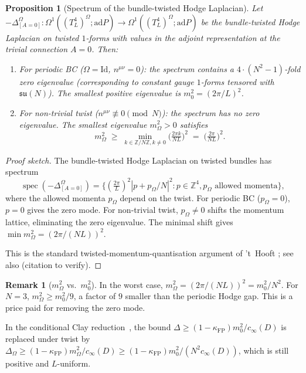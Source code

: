 \documentclass[11pt,a4paper]{amsart}
\newtheorem{proposition}[theorem]{Proposition}
\theoremstyle{definition}
\newtheorem{remark}[theorem]{Remark}
\newcommand{\Z}{\mathbb{Z}}
\newcommand{\su}{\mathfrak{su}}
\newcommand{\abs}[1]{\left\lvert#1\right\rvert}
\newcommand{\ad}{\mathrm{ad}}
\DeclareMathOperator{\spec}{spec}
\newcommand{\kFP}{\kappa_{\mathrm{FP}}}
\newcommand{\cinf}{c_{\infty}}
\begin{document}
\begin{proposition}[Spectrum of the bundle-twisted Hodge Laplacian]
\label{prop:Hodge-twisted}
Let $-\Delta_{[A=0]}^\Omega : \Omega^1((T^4_L)^\Omega; \ad P)
\to \Omega^1((T^4_L)^\Omega; \ad P)$ be the bundle-twisted
Hodge Laplacian on twisted $1$-forms with values in the adjoint
representation at the trivial connection $A=0$. Then:
\begin{enumerate}[label=(\roman*),leftmargin=2em]
\item For \emph{periodic} BC ($\Omega = \mathrm{Id}$, $n^{\mu\nu} = 0$):
the spectrum contains a $4 \cdot (N^2-1)$-fold zero eigenvalue
(corresponding to constant gauge $1$-forms tensored with $\su(N)$).
The smallest positive eigenvalue is $m_0^2 = (2\pi/L)^2$.
\item For \emph{non-trivial twist} ($n^{\mu\nu} \not\equiv 0 \pmod N$):
the spectrum has no zero eigenvalue. The smallest eigenvalue
$m_\Omega^2 > 0$ satisfies
$$
m_\Omega^2 \;\geq\; \min_{k\in\Z/N\Z, k\neq 0}\bigl(\tfrac{2\pi k}{N L}\bigr)^2
\;=\; \bigl(\tfrac{2\pi}{N L}\bigr)^2.
$$
\end{enumerate}
\end{proposition}
\begin{proof}[Proof sketch]
The bundle-twisted Hodge Laplacian on twisted bundles has spectrum
$$
\spec(-\Delta_{[A=0]}^\Omega) =
\{(\tfrac{2\pi}{L})^2 \abs{p + p_\Omega/N}^2 : p \in \Z^4, p_\Omega \text{ allowed momenta}\},
$$
where the allowed momenta $p_\Omega$ depend on the twist. For periodic
BC ($p_\Omega = 0$), $p=0$ gives the zero mode. For non-trivial twist,
$p_\Omega \neq 0$ shifts the momentum lattice, eliminating the zero
eigenvalue. The minimal shift gives $\min m_\Omega^2 = (2\pi/(NL))^2$.

This is the standard twisted-momentum-quantisation argument of 't~Hooft
\cite{tHooft1979}; see also \cite{vanBaal1996} (citation to verify).
\end{proof}

\begin{remark}[$m_\Omega^2$ vs.\ $m_0^2$]\label{rem:m-Omega}
In the worst case, $m_\Omega^2 = (2\pi/(NL))^2 = m_0^2 / N^2$. For
$N=3$, $m_\Omega^2 \geq m_0^2/9$, a factor of $9$ smaller than the
periodic Hodge gap. This is a price paid for removing the zero mode.

In the conditional Clay reduction~\cite{RemondiereKRFPB_2026}, the bound
$\Delta\geq(1-\kFP)m_0^2/\cinf(D)$ is replaced under twist by
$\Delta_\Omega\geq(1-\kFP)m_\Omega^2/\cinf(D)\geq (1-\kFP)m_0^2/(N^2 \cinf(D))$,
which is still positive and $L$-uniform.
\end{remark}
\end{document}
